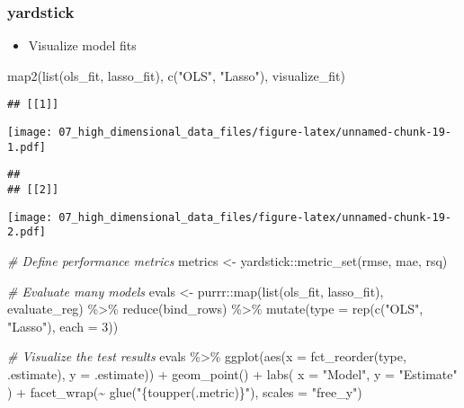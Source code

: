 \documentclass[
]{book}
\newenvironment{Shaded}{\begin{snugshade}}{\end{snugshade}}
\newcommand{\AttributeTok}[1]{\textcolor[rgb]{0.77,0.63,0.00}{#1}}
\newcommand{\CommentTok}[1]{\textcolor[rgb]{0.56,0.35,0.01}{\textit{#1}}}
\newcommand{\DecValTok}[1]{\textcolor[rgb]{0.00,0.00,0.81}{#1}}
\newcommand{\FunctionTok}[1]{\textcolor[rgb]{0.00,0.00,0.00}{#1}}
\newcommand{\NormalTok}[1]{#1}
\newcommand{\OtherTok}[1]{\textcolor[rgb]{0.56,0.35,0.01}{#1}}
\newcommand{\SpecialCharTok}[1]{\textcolor[rgb]{0.00,0.00,0.00}{#1}}
\newcommand{\StringTok}[1]{\textcolor[rgb]{0.31,0.60,0.02}{#1}}
\providecommand{\tightlist}{%
  \setlength{\itemsep}{0pt}\setlength{\parskip}{0pt}}
\begin{document}
\hypertarget{yardstick}{%
\subsubsection{yardstick}\label{yardstick}}

\begin{itemize}
\tightlist
\item
  Visualize model fits
\end{itemize}

\begin{Shaded}
\begin{Highlighting}[]
\FunctionTok{map2}\NormalTok{(}\FunctionTok{list}\NormalTok{(ols\_fit, lasso\_fit), }\FunctionTok{c}\NormalTok{(}\StringTok{"OLS"}\NormalTok{, }\StringTok{"Lasso"}\NormalTok{), visualize\_fit)}
\end{Highlighting}
\end{Shaded}

\begin{verbatim}
## [[1]]
\end{verbatim}

\texttt{[image: 07\_high\_dimensional\_data\_files/figure-latex/unnamed-chunk-19-1.pdf]}

\begin{verbatim}
## 
## [[2]]
\end{verbatim}

\texttt{[image: 07\_high\_dimensional\_data\_files/figure-latex/unnamed-chunk-19-2.pdf]}

\begin{Shaded}
\begin{Highlighting}[]
\CommentTok{\# Define performance metrics}
\NormalTok{metrics }\OtherTok{\textless{}{-}}\NormalTok{ yardstick}\SpecialCharTok{::}\FunctionTok{metric\_set}\NormalTok{(rmse, mae, rsq)}

\CommentTok{\# Evaluate many models}
\NormalTok{evals }\OtherTok{\textless{}{-}}\NormalTok{ purrr}\SpecialCharTok{::}\FunctionTok{map}\NormalTok{(}\FunctionTok{list}\NormalTok{(ols\_fit, lasso\_fit), evaluate\_reg) }\SpecialCharTok{\%\textgreater{}\%}
  \FunctionTok{reduce}\NormalTok{(bind\_rows) }\SpecialCharTok{\%\textgreater{}\%}
  \FunctionTok{mutate}\NormalTok{(}\AttributeTok{type =} \FunctionTok{rep}\NormalTok{(}\FunctionTok{c}\NormalTok{(}\StringTok{"OLS"}\NormalTok{, }\StringTok{"Lasso"}\NormalTok{), }\AttributeTok{each =} \DecValTok{3}\NormalTok{))}

\CommentTok{\# Visualize the test results}
\NormalTok{evals }\SpecialCharTok{\%\textgreater{}\%}
  \FunctionTok{ggplot}\NormalTok{(}\FunctionTok{aes}\NormalTok{(}\AttributeTok{x =} \FunctionTok{fct\_reorder}\NormalTok{(type, .estimate), }\AttributeTok{y =}\NormalTok{ .estimate)) }\SpecialCharTok{+}
  \FunctionTok{geom\_point}\NormalTok{() }\SpecialCharTok{+}
  \FunctionTok{labs}\NormalTok{(}
    \AttributeTok{x =} \StringTok{"Model"}\NormalTok{,}
    \AttributeTok{y =} \StringTok{"Estimate"}
\NormalTok{  ) }\SpecialCharTok{+}
  \FunctionTok{facet\_wrap}\NormalTok{(}\SpecialCharTok{\textasciitilde{}} \FunctionTok{glue}\NormalTok{(}\StringTok{"\{toupper(.metric)\}"}\NormalTok{), }\AttributeTok{scales =} \StringTok{"free\_y"}\NormalTok{)}
\end{Highlighting}
\end{Shaded}
\end{document}
